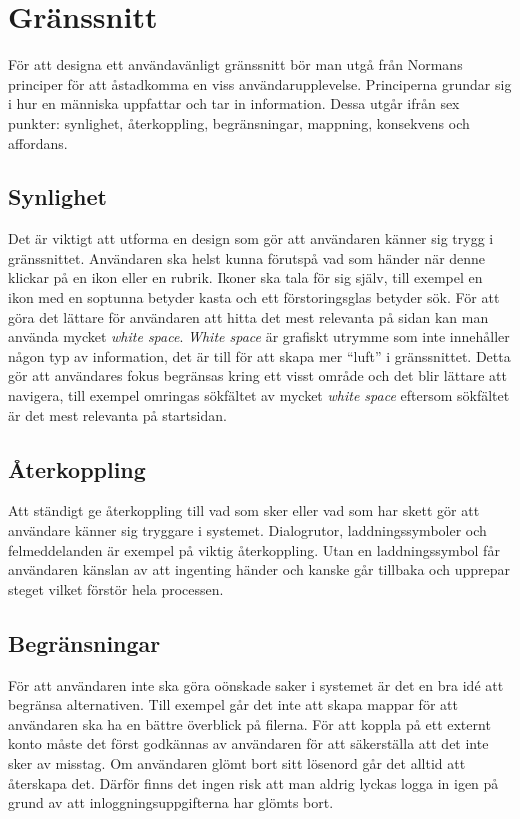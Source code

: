 \documentclass[a4paper,12pt,oneside,final]{extbook}
\begin{document}
\section{Gränssnitt}
För att designa ett användavänligt gränssnitt bör man utgå från Normans principer\cite{norman} för att åstadkomma en viss användarupplevelse. Principerna grundar sig i hur en människa uppfattar och tar in information. Dessa utgår ifrån sex punkter: synlighet, återkoppling, begränsningar, mappning, konsekvens och affordans. 

\subsection{Synlighet}
Det är viktigt att utforma en design som gör att användaren känner sig trygg i gränssnittet. Användaren ska helst kunna förutspå vad som händer när denne klickar på en ikon eller en rubrik. Ikoner ska tala för sig själv, till exempel en ikon med en soptunna betyder kasta och ett förstoringsglas betyder sök. För att göra det lättare för användaren att hitta det mest relevanta på sidan kan man använda mycket \textit{white space}\cite{whitespace}. \textit{White space} är grafiskt utrymme som inte innehåller någon typ av information, det är till för att skapa mer “luft” i gränssnittet. Detta gör att användares fokus begränsas kring ett visst område och det blir lättare att navigera, till exempel omringas sökfältet av mycket \textit{white space} eftersom sökfältet är det mest relevanta på startsidan.

\subsection{Återkoppling}
Att ständigt ge återkoppling till vad som sker eller vad som har skett gör att användare känner sig tryggare i systemet. Dialogrutor, laddningssymboler och felmeddelanden är exempel på viktig återkoppling\cite{norman}. Utan en laddningssymbol får användaren känslan av att ingenting händer och kanske går tillbaka och upprepar steget vilket förstör hela processen.

\subsection{Begränsningar}
För att användaren inte ska göra oönskade saker i systemet är det en bra idé att begränsa alternativen\cite{norman}. Till exempel går det inte att skapa mappar för att användaren ska ha en bättre överblick på filerna. För att koppla på ett externt konto måste det först godkännas av användaren för att säkerställa att det inte sker av misstag. Om användaren glömt bort sitt lösenord går det alltid att återskapa det. Därför finns det ingen risk att man aldrig lyckas logga in igen på grund av att inloggningsuppgifterna har glömts bort.
\end{document}
